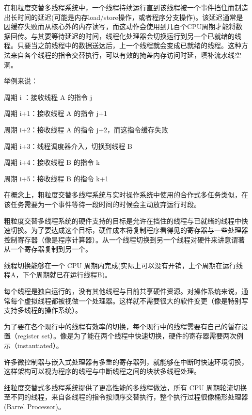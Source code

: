 在粗粒度交替多线程系统中，一个线程持续运行直到该线程被一个事件挡住而制造出长时间的延迟(可能是内存load/store操作，或者程序分支操作)。该延迟通常是因缓存失败而从核心外的内存读写，而这动作会使用到几百个CPU周期才能将数据回传。与其要等待延迟的时间，线程化处理器会切换运行到另一个已就绪的线程。只要当之前线程中的数据送达后，上一个线程就会变成已就绪的线程。这种方法来自各个线程的指令交替执行，可以有效的掩盖内存访问时延，填补流水线空洞。

举例来说：

\begin{compactenum}
\item 周期 i ：接收线程 A 的指令 j
\item 周期 i+1：接收线程 A 的指令 j+1
\item 周期 i+2：接收线程 A 的指令 j+2，而这指令缓存失败
\item 周期 i+3：线程调度器介入，切换到线程 B
\item 周期 i+4：接收线程 B 的指令 k
\item 周期 i+5：接收线程 B 的指令 k+1
\end{compactenum}

在概念上，粗粒度交替多线程系统与实时操作系统中使用的合作式多任务类似，在该任务需要为一个事件等待一段时间的时候会主动放弃运行时段。

粗粒度交替多线程系统的硬件支持的目标是允许在挡住的线程与已就绪的线程中快速切换。为了要达成这个目标，硬件成本将复制程序看得见的寄存器与一些处理器控制寄存器（像是程序计算器）。从一个线程切换到另一个线程对硬件来讲意谓著从一个寄存器复制到另一个。

\begin{compactitem}
\item 线程切换能够在一个 CPU 周期内完成(实际上可以没有开销，上个周期在运行线程A，下个周期就已在运行线程B)。
\item 每个线程是独自运行的，没有其他线程与目前共享硬件资源。对操作系统来说，通常每个虚拟线程都被视做一个处理器。这样就不需要很大的软件变更（像是特别写支持多线程的操作系统）。
\end{compactitem}

为了要在各个现行中的线程有效率的切换，每个现行中的线程需要有自己的暂存设置（register set）。像是为了能在两个线程中快速切换，硬件的寄存器需要两次例示（instantiated）。

许多微控制器与嵌入式处理器有多重的寄存器列，就能够在中断时快速环境切换，这样架构可以视为程序的线程与中断线程之间的块状多线程处理。


细粒度交替式多线程系统提供了更高性能的多线程做法，所有 CPU 周期轮流切换至不同的线程，来自各线程的指令按顺序交替执行，整个执行过程很像桶形处理器(Barrel Processor)。

